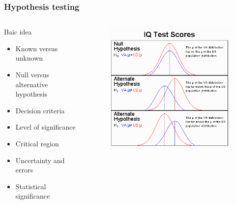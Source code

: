 \documentclass[10pt, compress]{beamer}
\begin{document}
\begin{frame}
    \frametitle{Hypothesis testing}
    \begin{columns}
        \begin{block}{Baic idea}
            \begin{itemize}
                \item Known versus unknown
                \item Null versus alternative hypothesis
                \item Decision criteria
                \item Level of significance
                \item Critical region
                \item Uncertainty and errors
                \item Statistical significance
            \end{itemize}
        \end{block}
        \begin{block}{}
            \begin{figure}
                \begin{center}
                    \includegraphics[scale=0.3]{img/IQ_Hypoth.png}
                \end{center}
            \end{figure}
        \end{block}
    \end{columns}
\end{frame}
\end{document}

